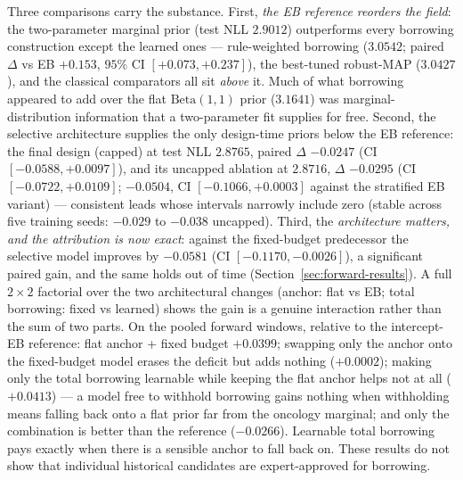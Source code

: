 \documentclass[11pt]{article}
\begin{document}
Three comparisons carry the substance. First, \emph{the EB reference
reorders the field}: the two-parameter marginal prior (test NLL $2.9012$)
outperforms every borrowing construction except the learned ones ---
rule-weighted borrowing ($3.0542$; paired $\Delta$ vs EB $+0.153$, $95\%$ CI
$[+0.073,+0.237]$), the best-tuned robust-MAP ($3.0427$), and the classical
comparators all sit \emph{above} it. Much of what borrowing appeared to add
over the flat $\mathrm{Beta}(1,1)$ prior ($3.1641$) was marginal-distribution
information that a two-parameter fit supplies for free. Second, the
selective architecture supplies the only design-time priors below the EB
reference: the final design (capped) at
test NLL $2.8765$, paired $\Delta$ $-0.0247$ (CI $[-0.0588,+0.0097]$), and
its uncapped ablation at $2.8716$, $\Delta$ $-0.0295$
(CI $[-0.0722,+0.0109]$; $-0.0504$, CI $[-0.1066,+0.0003]$ against the
stratified EB variant)
--- consistent leads whose intervals narrowly include zero (stable across
five training seeds: $-0.029$ to $-0.038$ uncapped). Third, the
\emph{architecture matters, and the attribution is now exact}: against the
fixed-budget predecessor the
selective model improves by $-0.0581$ (CI $[-0.1170,-0.0026]$), a significant
paired gain, and the same holds out of time
(Section~\ref{sec:forward-results}). A full $2 \times 2$ factorial over the
two architectural changes (anchor: flat vs EB; total borrowing: fixed vs
learned) shows the gain is a genuine interaction rather than the sum of two
parts. On the pooled forward windows, relative to the intercept-EB reference:
flat anchor + fixed budget $+0.0399$; swapping only the anchor onto the
fixed-budget model erases the deficit but adds nothing ($+0.0002$); making
only the total borrowing learnable while keeping the flat anchor helps not at
all ($+0.0413$) --- a model free to withhold borrowing gains nothing when
withholding means falling back onto a flat prior far from the oncology
marginal; and only the combination is better than the reference ($-0.0266$).
Learnable total borrowing pays exactly when there is a sensible anchor to
fall back on. These results do not show that individual
historical candidates are expert-approved for borrowing.
\end{document}

